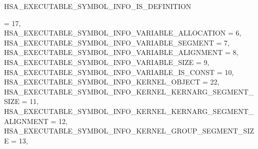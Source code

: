 \documentclass[final,oneside]{book}
\newcommand{\reftyp}[1]{#1}
\newcommand{\refenu}[1]{\reftyp{#1}}
\newenvironment{mylongtable}{\rowcolors{0}{lightgray}{lightgray}\longtable} {
\endlongtable}
\begin{document}
\begin{mylongtable}{@{}p{\textwidth}}
\hspace{1.7em}\hypertarget{group__executable_1gga27e2e3a930764e3e7385e1ceded09706a8d3c3e2425217495fd120dec5a3b60ee}{\refenu{HSA_\-EXECUTABLE_\-SYMBOL_\-INFO_\-IS_\-DEFINITION}} = 17,\\
\hspace{1.7em}\hypertarget{group__executable_1gga27e2e3a930764e3e7385e1ceded09706a7321c11fe73af65d09ef2718de8d1068}{\refenu{HSA_\-EXECUTABLE_\-SYMBOL_\-INFO_\-VARIABLE_\-ALLOCATION}} = 6,\\
\hspace{1.7em}\hypertarget{group__executable_1gga27e2e3a930764e3e7385e1ceded09706aa08f904d38d9ae932e16554353f40385}{\refenu{HSA_\-EXECUTABLE_\-SYMBOL_\-INFO_\-VARIABLE_\-SEGMENT}} = 7,\\
\hspace{1.7em}\hypertarget{group__executable_1gga27e2e3a930764e3e7385e1ceded09706a36a2ab0fe14663431a18ddc0334bd9a6}{\refenu{HSA_\-EXECUTABLE_\-SYMBOL_\-INFO_\-VARIABLE_\-ALIGNMENT}} = 8,\\
\hspace{1.7em}\hypertarget{group__executable_1gga27e2e3a930764e3e7385e1ceded09706a060eddd4211e1537c84c26a3efabddb0}{\refenu{HSA_\-EXECUTABLE_\-SYMBOL_\-INFO_\-VARIABLE_\-SIZE}} = 9,\\
\hspace{1.7em}\hypertarget{group__executable_1gga27e2e3a930764e3e7385e1ceded09706a966dac196eeca9f48f1554c5f60b410d}{\refenu{HSA_\-EXECUTABLE_\-SYMBOL_\-INFO_\-VARIABLE_\-IS_\-CONST}} = 10,\\
\hspace{1.7em}\hypertarget{group__executable_1gga27e2e3a930764e3e7385e1ceded09706a470a6121ba8c19a1ba9aba4938c323d2}{\refenu{HSA_\-EXECUTABLE_\-SYMBOL_\-INFO_\-KERNEL_\-OBJECT}} = 22,\\
\hspace{1.7em}\hypertarget{group__executable_1gga27e2e3a930764e3e7385e1ceded09706a1ba9b07c04f6df7f4d75396d0aecd4a3}{\refenu{HSA_\-EXECUTABLE_\-SYMBOL_\-INFO_\-KERNEL_\-KERNARG_\-SEGMENT_\-SIZE}} = 11,\\
\hspace{1.7em}\hypertarget{group__executable_1gga27e2e3a930764e3e7385e1ceded09706a3f8d5fc87fafbab9aaf129396116f88a}{\refenu{HSA_\-EXECUTABLE_\-SYMBOL_\-INFO_\-KERNEL_\-KERNARG_\-SEGMENT_\-ALIGNMENT}} = 12,\\
\hspace{1.7em}\hypertarget{group__executable_1gga27e2e3a930764e3e7385e1ceded09706a65504ccc292e39d9709f172b4a42fe2a}{\refenu{HSA_\-EXECUTABLE_\-SYMBOL_\-INFO_\-KERNEL_\-GROUP_\-SEGMENT_\-SIZE}} = 13,\\

\end{mylongtable}
\end{document}
